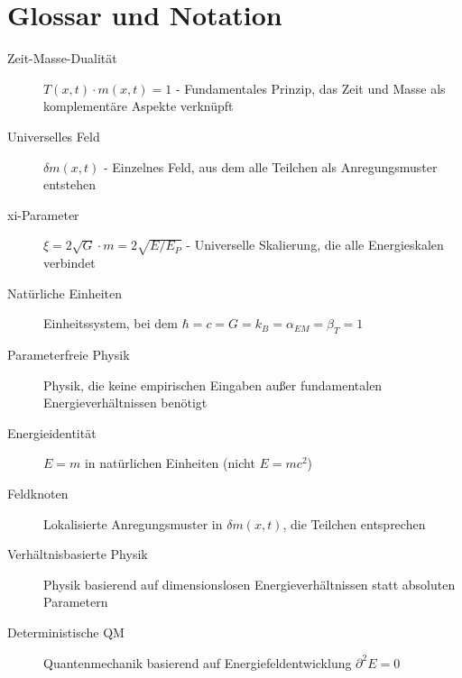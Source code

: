 \documentclass[12pt,a4paper]{report}
\begin{document}
	\chapter{Glossar und Notation}
	
	\begin{description}
		\item[Zeit-Masse-Dualität] $T(x,t) \cdot m(x,t) = 1$ - Fundamentales Prinzip, das Zeit und Masse als komplementäre Aspekte verknüpft
		\item[Universelles Feld] $\delta m(x,t)$ - Einzelnes Feld, aus dem alle Teilchen als Anregungsmuster entstehen
		\item[xi-Parameter] $\xi = 2\sqrt{G} \cdot m = 2\sqrt{E/E_P}$ - Universelle Skalierung, die alle Energieskalen verbindet
		\item[Natürliche Einheiten] Einheitssystem, bei dem $\hbar = c = G = k_B = \alpha_{EM} = \beta_T = 1$
		\item[Parameterfreie Physik] Physik, die keine empirischen Eingaben außer fundamentalen Energieverhältnissen benötigt
		\item[Energieidentität] $E = m$ in natürlichen Einheiten (nicht $E = mc^2$)
		\item[Feldknoten] Lokalisierte Anregungsmuster in $\delta m(x,t)$, die Teilchen entsprechen
		\item[Verhältnisbasierte Physik] Physik basierend auf dimensionslosen Energieverhältnissen statt absoluten Parametern
		\item[Deterministische QM] Quantenmechanik basierend auf Energiefeldentwicklung $\partial^2 E = 0$
	\end{description}
	
\end{document}
